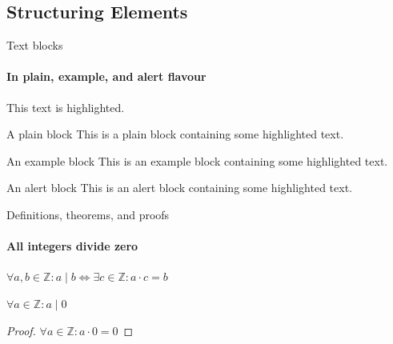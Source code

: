 \documentclass{beamer}
\begin{document}
    \subsection{Structuring Elements}
    \begin{frame}[label=simmonshall]{Text blocks}
      \framesubtitle{In plain, example, and \alert{alert} flavour}
      \alert{This text} is highlighted.

      \begin{block}{A plain block}
        This is a plain block containing some \alert{highlighted text}.
      \end{block}
      \begin{exampleblock}{An example block}
        This is an example block containing some \alert{highlighted text}.
      \end{exampleblock}
      \begin{alertblock}{An alert block}
        This is an alert block containing some \alert{highlighted text}.
      \end{alertblock}
    \end{frame}

    \begin{frame}[label=proof]{Definitions, theorems, and proofs}
      \framesubtitle{All integers divide zero}
      \begin{definition}
        $\forall a,b\in\mathds{Z}: a\mid b\iff\exists c\in\mathds{Z}:a\cdot c=b$
      \end{definition}
      \begin{theorem}
        $\forall a\in\mathds{Z}: a\mid 0$
      \end{theorem}
      \begin{proof}[Proof\nopunct]
        $\forall a\in\mathds{Z}: a\cdot 0=0$
      \end{proof}
    \end{frame}
\end{document}

